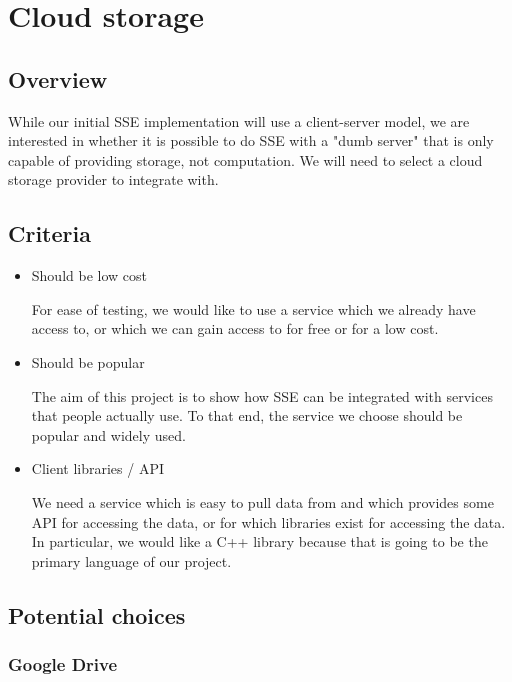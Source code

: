 \documentclass[onecolumn, draftclsnofoot,10pt, compsoc]{IEEEtran}
\begin{document}
\section{ Cloud storage }

\subsection{ Overview }

While our initial SSE implementation will use a client-server model, we are interested in whether it is possible to do SSE with a "dumb server" that is only capable of providing storage, not computation.
We will need to select a cloud storage provider to integrate with.

\subsection{ Criteria }

\begin{itemize}
  \item Should be low cost

  For ease of testing, we would like to use a service which we already have access to, or which we can gain access to for free or for a low cost.

  \item Should be popular

  The aim of this project is to show how SSE can be integrated with services that people actually use. To that end, the service we choose should be popular and widely used.

  \item Client libraries / API

  We need a service which is easy to pull data from and which provides some API for accessing the data, or for which libraries exist for accessing the data. In particular, we would like a C++ library because that is going to be the primary language of our project.

\end{itemize}

\subsection{ Potential choices }
\subsubsection{ Google Drive }
\end{document}
